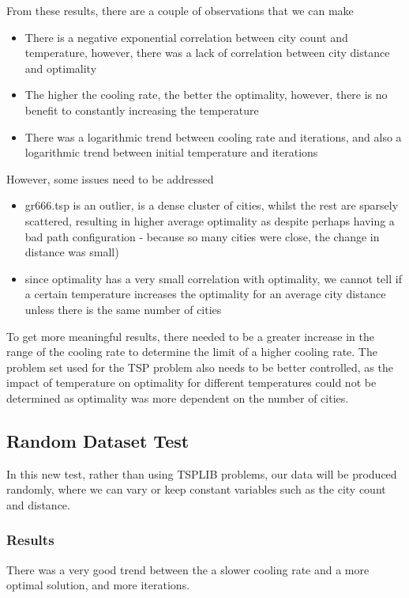 \documentclass{article}
\begin{document}
From these results, there are a couple of observations that we can make
\begin{itemize}
    \item There is a negative exponential correlation between city count and temperature, however, there was a lack of correlation between city distance and optimality
    \item The higher the cooling rate, the better the optimality, however, there is no benefit to constantly increasing the temperature
    \item There was a logarithmic trend between cooling rate and iterations, and also a logarithmic trend between initial temperature and iterations
\end{itemize}

However, some issues need to be addressed
\begin{itemize}
    \item gr666.tsp is an outlier, is a dense cluster of cities, whilst the rest are sparsely scattered, resulting in higher average optimality as despite perhaps having a bad path configuration - because so many cities were close, the change in distance was small)
    \item since optimality has a very small correlation with optimality, we cannot tell if a certain temperature increases the optimality for an average city distance unless there is the same number of cities
\end{itemize}

To get more meaningful results, there needed to be a greater increase in the range of the cooling rate to determine the limit of a higher cooling rate.
The problem set used for the TSP problem also needs to be better controlled, as the impact of temperature on optimality for different temperatures could not be determined as optimality was more dependent on the number of cities.

\subsection{Random Dataset Test}
In this new test, rather than using TSPLIB problems, our data will be produced randomly, where we can vary or keep constant variables such as the city count and distance.

\subsubsection{Results}

There was a very good trend between the a slower cooling rate and a more optimal solution, and more iterations.
\end{document}

